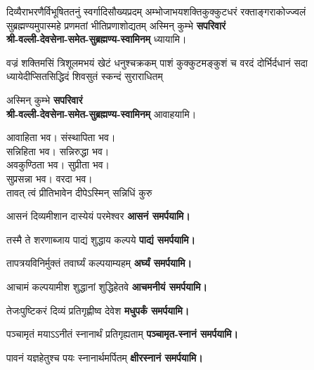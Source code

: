 \begin{center}

{दिव्यैराभरणैर्विभूषिततनुं स्वर्गादिसौख्यप्रदम्}
{अम्भोजाभयशक्तिकुक्कुटधरं रक्ताङ्गराकोज्ज्वलं}
{सुब्रह्मण्यमुपास्महे प्रणमतां भीतिप्रणाशोद्यतम्}
\nobreak%
अस्मिन् कुम्भे \textbf{सपरिवारं\\
श्री-वल्ली-देवसेना-समेत-सुब्रह्मण्य-स्वामिनम्} ध्यायामि।

{वज्रं शक्तिमसिं त्रिशूलमभयं खेटं धनुश्चक्रकम्}
{पाशं कुक्कुटमङ्कुशं च वरदं दोर्भिर्दधानं सदा}
{ध्यायेदीप्सितसिद्धिदं शिवसुतं स्कन्दं सुराराधितम्}

\nobreak%
अस्मिन् कुम्भे \textbf{सपरिवारं\\
श्री-वल्ली-देवसेना-समेत-सुब्रह्मण्य-स्वामिनम्} आवाहयामि। 

आवाहिता भव। संस्थापिता भव।\\
सन्निहिता भव। सन्निरुद्धा भव।\\
अवकुण्ठिता भव। सुप्रीता भव।\\
सुप्रसन्ना भव। वरदा भव।\\

{तावत् त्वं प्रीतिभावेन दीपेऽस्मिन् सन्निधिं कुरु}

{आसनं दिव्यमीशान दास्येयं परमेश्वर}
\nobreak%
\textbf{\devAya{} आसनं समर्पयामि।}

{तस्मै ते शरणाब्जाय पाद्यं शुद्धाय कल्पये}
\nobreak%
\textbf{\devAya{} पाद्यं समर्पयामि।}

{तापत्रयविनिर्मुक्तं तवार्घ्यं कल्पयाम्यहम्}
\nobreak%
 \textbf{\devAya{} अर्घ्यं समर्पयामि।}

{आचामं कल्पयामीश शुद्धानां शुद्धिहेतवे}
\nobreak%
\textbf{\devAya{} आचमनीयं समर्पयामि।}

{तेजःपुष्टिकरं दिव्यं प्रतिगृह्णीष्व देवेश}
\nobreak%
\textbf{\devAya{} मधुपर्कं समर्पयामि।}

{पञ्चामृतं मयाऽऽनीतं स्नानार्थं प्रतिगृह्यताम्}
\nobreak%
\textbf{\devAya{} पञ्चामृत-स्नानं समर्पयामि।}

{पावनं यज्ञहेतुश्च पयः स्नानार्थमर्पितम्}
\nobreak%
\textbf{\devAya{} क्षीरस्नानं समर्पयामि।}


\end{center}
